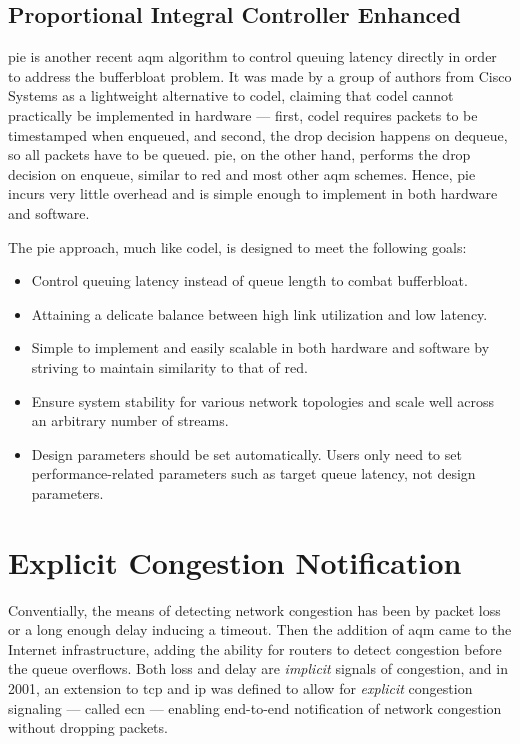 \subsection{Proportional Integral Controller Enhanced}

\gls{pie} is another recent \gls{aqm} algorithm to control queuing latency directly in order to address the bufferbloat problem. It was made by a group of authors from Cisco Systems as a lightweight alternative to \gls{codel}, claiming that \gls{codel} cannot practically be implemented in hardware --- first, \gls{codel} requires packets to be timestamped when enqueued, and second, the drop decision happens on dequeue, so all packets have to be queued. \gls{pie}, on the other hand, performs the drop decision on enqueue, similar to \gls{red} and most other \gls{aqm} schemes. Hence, \gls{pie} incurs very little overhead and is simple enough to implement in both hardware and software.

The \gls{pie} approach, much like \gls{codel}, is designed to meet the following goals: \cite{rfc8033}

\begin{itemize}
    \item Control queuing latency instead of queue length to combat bufferbloat.
    \item Attaining a delicate balance between high link utilization and low latency.
    \item Simple to implement and easily scalable in both hardware and software by striving to maintain similarity to that of \gls{red}.
    \item Ensure system stability for various network topologies and scale well across an arbitrary number of streams.
    \item Design parameters should be set automatically. Users only need to set performance-related parameters such as target queue latency, not design parameters.
\end{itemize}







\section{Explicit Congestion Notification}

Conventially, the means of detecting network congestion has been by packet loss or a long enough delay inducing a timeout. Then the addition of \gls{aqm} came to the Internet infrastructure, adding the ability for routers to detect congestion before the queue overflows. Both loss and delay are \textit{implicit} signals of congestion, and in 2001, an extension to \gls{tcp} and \gls{ip} was defined \cite{rfc3168} to allow for \textit{explicit} congestion signaling --- called \gls{ecn} --- enabling end-to-end notification of network congestion without dropping packets.

